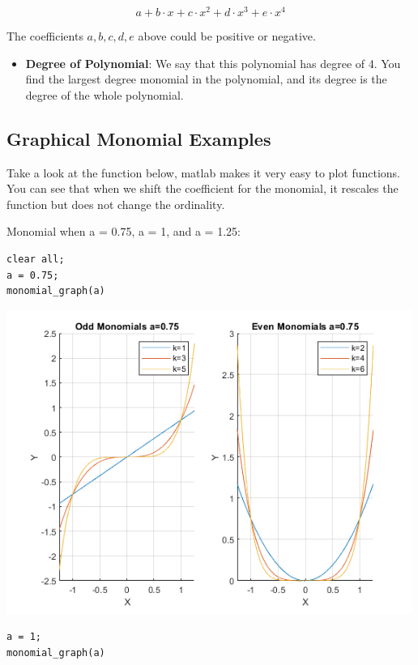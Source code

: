 \documentclass[
]{book}
\providecommand{\tightlist}{%
  \setlength{\itemsep}{0pt}\setlength{\parskip}{0pt}}
\begin{document}
\[a+b\cdot x+c\cdot x^2 +d\cdot x^3 +e\cdot x^4\]

The coefficients \(a,b,c,d,e\) above could be positive or negative.

\begin{itemize}
\tightlist
\item
  \textbf{Degree of Polynomial}: We say that this polynomial has degree
  of 4. You find the largest degree monomial in the polynomial, and
  its degree is the degree of the whole polynomial.
\end{itemize}

\hypertarget{graphical-monomial-examples}{%
\subsection{Graphical Monomial Examples}\label{graphical-monomial-examples}}

Take a look at the function below, matlab makes it very easy to plot
functions. You can see that when we shift the coefficient for the
monomial, it rescales the function but does not change the ordinality.

Monomial when a = 0.75, a = 1, and a = 1.25:

\begin{verbatim}
clear all;
a = 0.75;
monomial_graph(a)
\end{verbatim}

\includegraphics[width=5.20833in,height=\textheight]{img/polynomial_images/figure_0.png}

\begin{verbatim}
a = 1;
monomial_graph(a)
\end{verbatim}
\end{document}
